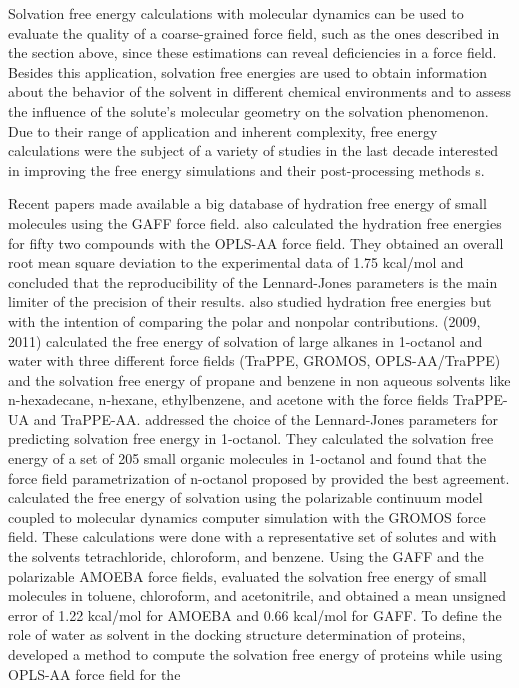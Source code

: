 Solvation free energy calculations with molecular dynamics can be used to evaluate the quality of a coarse-grained force field, such as the ones described in the section above, since these estimations can reveal deficiencies in a force field. Besides this application, solvation free energies are used to obtain information about the behavior of the solvent in different chemical environments and to assess the influence of the solute's molecular geometry on the solvation phenomenon. Due to their range of application and inherent complexity, free energy calculations were the subject of a variety of studies in the last decade interested in improving the free energy simulations and their post-processing methods \cite{mbar,bareva,dexp,gdel}s.

Recent papers \cite{PMID:24928188,mobley2017} made available a big database of hydration free energy of small molecules using the GAFF force field.  also calculated the hydration free energies for fifty two compounds with the OPLS-AA force field. They obtained an overall root mean square deviation to the experimental data of 1.75 kcal/mol and concluded that the reproducibility of the Lennard-Jones parameters is the main limiter of the precision of their results.  also studied hydration free energies but with the intention of comparing the polar and nonpolar contributions. \citeauthor{garrido2011} (2009, 2011) calculated the free energy of solvation of large alkanes in 1-octanol and water with three different force fields (TraPPE, GROMOS, OPLS-AA/TraPPE) and the solvation free energy of propane and benzene in non aqueous solvents like n-hexadecane, n-hexane, ethylbenzene, and acetone  with the force fields TraPPE-UA and TraPPE-AA.  addressed the choice of the Lennard-Jones parameters for predicting solvation free energy in 1-octanol. They calculated the solvation free energy of a set of 205 small organic molecules in 1-octanol and found that the force field parametrization of n-octanol proposed by  provided the best agreement.  calculated the free energy of solvation using the polarizable continuum model coupled to molecular dynamics computer simulation with the GROMOS force field. These calculations were done with a representative set of solutes and with the solvents tetrachloride, chloroform, and benzene. Using the GAFF and the polarizable AMOEBA force fields,  evaluated the solvation free energy of small molecules in toluene, chloroform, and acetonitrile, and obtained a mean unsigned error of 1.22 kcal/mol for AMOEBA and 0.66 kcal/mol for GAFF. To define the role of water as solvent in the docking structure determination of proteins,  developed a method to compute the solvation free energy of proteins while using OPLS-AA force field for the
